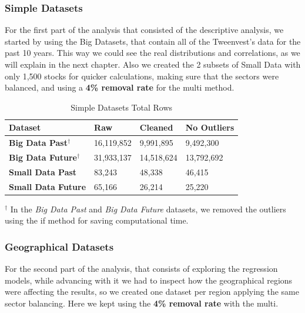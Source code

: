 \documentclass[11pt,english,a4paper,hidelinks]{book}
\begin{document}
\subsubsection{Simple Datasets}
\noindent For the first part of the analysis that consisted of the descriptive analysis, we started by using the Big Datasets, that contain all of the Tweenvest's data for the past 10 years. This way we could see the real distributions and correlations, as we will explain in the next chapter. Also we created the 2 subsets of Small Data with only 1,500 stocks for quicker calculations, making sure that the sectors were balanced, and using a \textbf{4\% removal rate} for the \acrshort{multi} method.

\begin{table}[H]
    \centering
    \caption{Simple Datasets Total Rows}
    \begin{tabular}{|l|l|l|l|}
        \hline  
        \textbf{Dataset} & \textbf{Raw} & \textbf{Cleaned} & \textbf{No Outliers} \\
        \hline
        \textbf{Big Data Past$^\dagger$} & 16,119,852 & 9,991,895 & 9,492,300 \\
        \hline
        \textbf{Big Data Future$^\dagger$} & 31,933,137 & 14,518,624 & 13,792,692 \\
        \hline 
        \textbf{Small Data Past} & 83,243 & 48,338 & 46,415 \\
        \hline
        \textbf{Small Data Future} & 65,166 & 26,214 & 25,220 \\
        \hline
        \end{tabular}
    \label{tab:simple_datasets_rows}
\end{table}

\noindent $^\dagger$ In the \textit{Big Data Past} and \textit{Big Data Future} datasets, we removed the outliers using the \acrshort{if} method for saving computational time.

\subsubsection{Geographical Datasets}

\noindent For the second part of the analysis, that consists of exploring the regression models, while advancing with it we had to inspect how the geographical regions were affecting the results, so we created one dataset per region applying the same sector balancing. Here  we kept using the \textbf{4\% removal rate} with the \acrshort{multi}.
\end{document}
